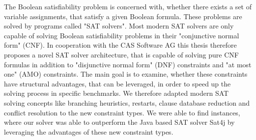 
\Abstract

The Boolean satisfiability problem is concerned with, whether there exists a set of variable assignments, that satisfy a given Boolean formula. These problems are solved by programs called "SAT solvers". Most modern SAT solvers are only capable of solving Boolean satisfiability problems in their "conjunctive normal form" (CNF). In cooperation with the CAS Software AG this thesis therefore proposes a novel SAT solver architecture, that is capable of solving pure CNF formulas in addition to "disjunctive normal form" (DNF) constraints and "at most one" (AMO) constraints. The main goal is to examine, whether these constraints have structural advantages, that can be leveraged, in order to speed up the solving process in specific benchmarks. We therefore adapted modern SAT solving concepts like branching heuristics, restarts, clause database reduction and conflict resolution to the new constraint types. We were able to find instances, where our solver was able to outperform the Java based SAT solver Sat4j by leveraging the advantages of these new constraint types.
